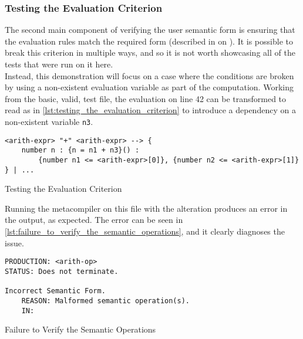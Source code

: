 
\subsubsection{Testing the Evaluation Criterion} %
\label{ssub:testing_the_evaluation_criterion}
The second main component of verifying the user semantic form is ensuring that the evaluation rules match the required form (described in  on ).
It is possible to break this criterion in multiple ways, and so it is not worth showcasing all of the tests that were run on it here.\\

Instead, this demonstration will focus on a case where the conditions are broken by using a non-existent evaluation variable as part of the computation.
Working from the basic, valid, test file, the evaluation on line 42 can be transformed to read as in \autoref{lst:testing_the_evaluation_criterion} to introduce a dependency on a non-existent variable \texttt{n3}.

\begin{listing}[!htb]
\begin{verbatim}
<arith-expr> "+" <arith-expr> --> {
    number n : {n = n1 + n3}() :
        {number n1 <= <arith-expr>[0]}, {number n2 <= <arith-expr>[1]}
} | ...
\end{verbatim}
\caption{Testing the Evaluation Criterion}
\label{lst:testing_the_evaluation_criterion}
\end{listing}

Running the metacompiler on this file with the alteration produces an error in the output, as expected. 
The error can be seen in \autoref{lst:failure_to_verify_the_semantic_operations}, and it clearly diagnoses the issue. 

\begin{listing}[!htb]
\begin{verbatim}
PRODUCTION: <arith-op>
STATUS: Does not terminate.

Incorrect Semantic Form.
    REASON: Malformed semantic operation(s).
    IN:
\end{verbatim}
\caption{Failure to Verify the Semantic Operations}
\label{lst:failure_to_verify_the_semantic_operations}
\end{listing}


